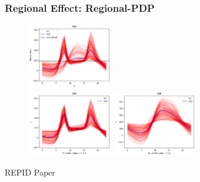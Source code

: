 \documentclass{beamer}
\begin{document}
\begin{frame}
  \frametitle{Regional Effect: Regional-PDP}
  \begin{figure}[ht]
    \centering
    \includegraphics[width=0.33\textwidth]{./figures/bike_sharing_global_pdp_heterogeneity.png}\\
    \includegraphics[width=0.33\textwidth]{./figures/bike_sharing_regional_pdp_workingdays.png}
    \includegraphics[width=0.33\textwidth]{./figures/bike_sharing_regional_pdp_weekends.png}
  \end{figure}
  \noindent\makebox[\linewidth]{\rule{\paperwidth}{0.4pt}}
  REPID Paper~\citep{herbinger_repid_2022}
\end{frame}
\end{document}
